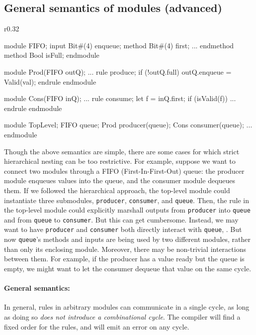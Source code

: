 \subsection{General semantics of modules (advanced)}
\label{sec:generalmodsemantics}

\begin{wrapfigure}{r}{0.32\columnwidth}
\vspace{-4em}
\begin{mscode}
module FIFO;
  input Bit#(4) enqueue;
  method Bit#(4) first;
    ...
  endmethod
  method Bool isFull;
endmodule

module Prod(FIFO outQ);
  ...
  rule produce;
    if (!outQ.full)
      outQ.enqueue = Valid(val);
  endrule
endmodule

module Cons(FIFO inQ);
  ...
  rule consume;
    let f = inQ.first;
    if (isValid(f)) ...
  endrule
endmodule

module TopLevel;
  FIFO queue;
  Prod producer(queue);
  Cons consumer(queue);
  ...
endmodule
\end{mscode}
\vspace{-4em}
\end{wrapfigure}



Though the above semantics are simple, there are some cases for which strict hierarchical nesting can be too restrictive.
For example, suppose we want to connect two modules through a FIFO (First-In-First-Out) queue:
the producer module enqueues values into the queue, and the consumer module dequeues them.
If we followed the hierarchical approach, the top-level module could instantiate three submodules,
\texttt{producer}, \texttt{consumer}, and \texttt{queue}.
Then, the rule in the top-level module could explicitly marshall outputs
from \texttt{producer} into \texttt{queue} and from \texttt{queue} to \texttt{consumer}.
But this can get cumbersome.
Instead, we may want to have \texttt{producer} and \texttt{consumer} both directly
interact with \texttt{queue}, .
But now \texttt{queue}'s methods and inputs are being used by two different modules,
rather than only its enclosing module.
Moreover, there may be non-trivial interactions between them.
For example, if the producer has a value ready but the queue is empty,
we might want to let the consumer dequeue that value on the same cycle.

\paragraph{General semantics:}
In general, rules in arbitrary modules can communicate in a single cycle, as long as
doing so \emph{does not introduce a combinational cycle}.
The compiler will find a fixed order for the rules, and will emit an error on any cycle.

